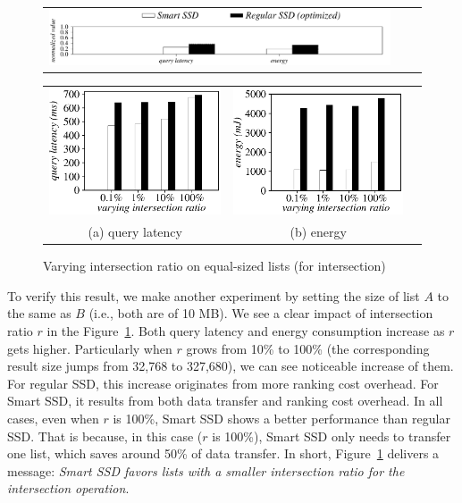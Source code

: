   \begin{figure}[tbp]
  \centering
    \begin{tabular}{ccc}
 \includegraphics[width=0.52\columnwidth]{figures/banner2.pdf}
\end{tabular}
\vspace{-0.1cm}
\renewcommand{\tabcolsep}{0.1mm}
  \begin{tabular}{ccc}
 \includegraphics[width=0.5\columnwidth]{figures/Intersection-time-VaryInterRatio-equal2.eps}&
  \includegraphics[width=0.5\columnwidth]{figures/Intersection-energy-VaryInterRatio-equal2.eps}\\
  (a) query latency & (b) energy\\
\end{tabular}
  \caption{Varying intersection ratio on equal-sized lists (for intersection)}
  \label{fig:varyInterRatioIntersection2}
 \end{figure}


To verify this result, we make another experiment by setting the size of list $A$ to the same as $B$ (i.e., both are of 10 MB). %
We see a clear impact of intersection ratio $r$ in the Figure~\ref{fig:varyInterRatioIntersection2}.
Both query latency and energy consumption increase as $r$ gets higher. Particularly when $r$ grows from 10\% to 100\% (the corresponding result size jumps from 32,768 to 327,680), we can see noticeable increase of them. For regular SSD, this increase originates from more ranking cost overhead. For Smart SSD, it results from both data transfer and ranking cost overhead.
In all cases, even when $r$ is 100\%, Smart SSD shows a better performance than regular SSD. That is because, in this case ($r$ is 100\%), Smart SSD only needs to transfer one list, which saves around 50\% of data transfer.
In short, Figure~\ref{fig:varyInterRatioIntersection2} delivers a message: \emph{Smart SSD favors lists with a smaller intersection ratio for the \textsf{intersection} operation}.



